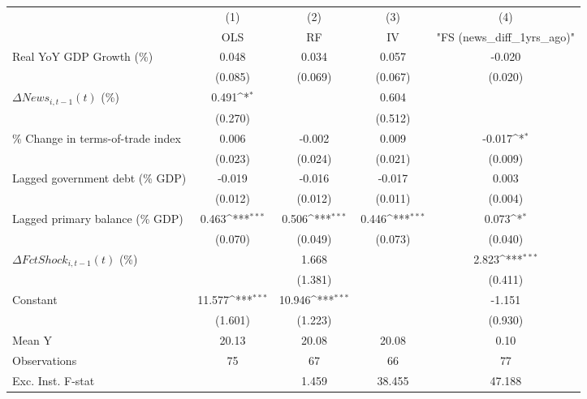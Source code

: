 {
\def\sym#1{\ifmmode^{#1}\else\(^{#1}\)\fi}
\begin{tabular}{l*{4}{c}}
\toprule
                    &\multicolumn{1}{c}{(1)}&\multicolumn{1}{c}{(2)}&\multicolumn{1}{c}{(3)}&\multicolumn{1}{c}{(4)}\\
                    &\multicolumn{1}{c}{OLS}&\multicolumn{1}{c}{RF}&\multicolumn{1}{c}{IV}&\multicolumn{1}{c}{ "FS (news_diff_1yrs_ago)" }\\
\midrule
Real YoY GDP Growth (\%)&       0.048         &       0.034         &       0.057         &      -0.020         \\
                    &     (0.085)         &     (0.069)         &     (0.067)         &     (0.020)         \\
\addlinespace
$ \Delta News_{i,t-1}(t)$ (\%)&       0.491\sym{*}  &                     &       0.604         &                     \\
                    &     (0.270)         &                     &     (0.512)         &                     \\
\addlinespace
\% Change in terms-of-trade index&       0.006         &      -0.002         &       0.009         &      -0.017\sym{*}  \\
                    &     (0.023)         &     (0.024)         &     (0.021)         &     (0.009)         \\
\addlinespace
Lagged government debt (\% GDP)&      -0.019         &      -0.016         &      -0.017         &       0.003         \\
                    &     (0.012)         &     (0.012)         &     (0.011)         &     (0.004)         \\
\addlinespace
Lagged primary balance (\% GDP)&       0.463\sym{***}&       0.506\sym{***}&       0.446\sym{***}&       0.073\sym{*}  \\
                    &     (0.070)         &     (0.049)         &     (0.073)         &     (0.040)         \\
\addlinespace
$ \Delta FctShock_{i,t-1}(t)$ (\%)&                     &       1.668         &                     &       2.823\sym{***}\\
                    &                     &     (1.381)         &                     &     (0.411)         \\
\addlinespace
Constant            &      11.577\sym{***}&      10.946\sym{***}&                     &      -1.151         \\
                    &     (1.601)         &     (1.223)         &                     &     (0.930)         \\
\midrule
Mean Y              &       20.13         &       20.08         &       20.08         &        0.10         \\
Observations        &          75         &          67         &          66         &          77         \\
Exc. Inst. F-stat   &                     &       1.459         &      38.455         &      47.188         \\
\bottomrule
\end{tabular}
}
